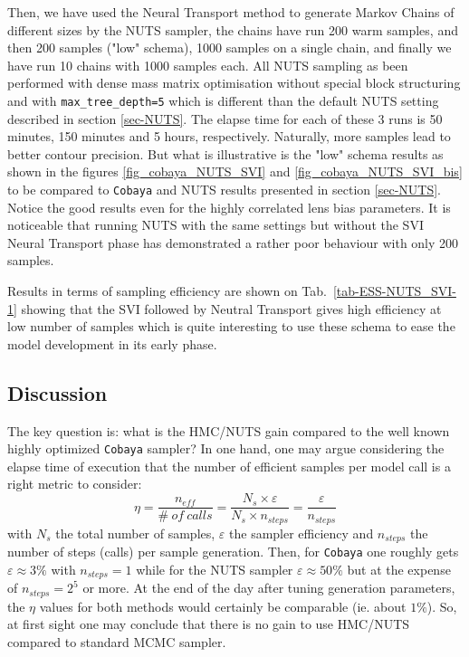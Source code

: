 \documentclass[final,5p,times,twocolumn,authoryear]{elsarticle}
\begin{document}
Then, we have used the Neural Transport method to generate Markov Chains of different sizes by the NUTS sampler, the chains have run 200 warm samples, and then 200 samples ("low" schema), 1000 samples on a single chain, and finally we have run 10 chains  with 1000 samples each. All NUTS sampling as been performed with dense mass matrix optimisation without special block structuring and with \texttt{max\_tree\_depth=5} which is different than the default NUTS setting described in section \ref{sec-NUTS}. The elapse time for each of these 3 runs is 50 minutes, 150 minutes and 5 hours, respectively. Naturally, more samples lead to better contour precision. But what is illustrative is the "low" schema results as shown in the figures \ref{fig_cobaya_NUTS_SVI} and \ref{fig_cobaya_NUTS_SVI_bis}  to be compared to \texttt{Cobaya} and NUTS results presented in section \ref{sec-NUTS}. Notice the good results even for the highly correlated lens bias parameters. It is noticeable that running NUTS with the same settings  but without the SVI Neural Transport phase has demonstrated a rather poor behaviour with only 200 samples.  

Results in terms of sampling efficiency are shown on Tab.~\ref{tab-ESS-NUTS_SVI-1} showing that the SVI followed by Neutral Transport gives high efficiency at low number of samples which is quite interesting to use these schema to ease the model development in its early phase.
%
\subsection{Discussion}
%
The key question is: what is the HMC/NUTS gain compared to the well known highly optimized \texttt{Cobaya} sampler? 
In one hand, one may argue considering the elapse time of execution that the number of efficient samples per model call is a right metric to consider: 
\begin{equation}
    \eta = \frac{n_{eff}}{\#\ of\ calls} = \frac{N_s \times \varepsilon}{N_s \times n_{steps}} = \frac{\varepsilon}{n_{steps}}
\end{equation}
with $N_s$ the total number of samples, $\varepsilon$ the sampler efficiency and $n_{steps}$ the number of steps (calls) per sample generation. Then, for \texttt{Cobaya} one roughly gets $\varepsilon\approx 3\%$ with $n_{steps}=1$ while for the NUTS sampler $\varepsilon\approx 50\%$ but at the expense of $n_{steps}=2^5$ or more. At the end of the day after tuning generation parameters, the $\eta$ values for both methods would certainly be comparable (ie. about $1\%$). So, at first sight one may conclude that there is no gain to use HMC/NUTS compared to standard MCMC sampler.  
\end{document}
